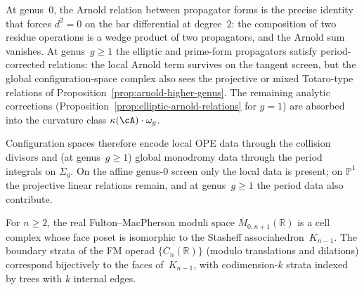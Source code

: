 \begin{example}
At genus~$0$, the Arnold relation between propagator forms is the precise
identity that forces $d^2 = 0$ on the bar differential at degree~$2$:
the composition of two residue operations is a wedge product of two
propagators, and the Arnold sum vanishes. At genus~$g \geq 1$ the
elliptic and prime-form propagators satisfy period-corrected relations:
the local Arnold term survives on the tangent screen, but the global
configuration-space complex also sees the projective or mixed
Totaro-type relations of Proposition~\ref{prop:arnold-higher-genus}.
The remaining analytic corrections
\textup{(}Proposition~\ref{prop:elliptic-arnold-relations} for $g = 1$\textup{)}
are absorbed into the curvature class
$\kappa(\cA)\cdot \omega_g$.

Configuration spaces therefore encode local OPE data through the
collision divisors and (at genus~$g \geq 1$) global monodromy data
through the period integrals on $\Sigma_g$. On the affine genus-$0$
screen only the local data is present; on $\mathbb{P}^1$ the
projective linear relations remain, and at genus~$g \geq 1$ the period
data also contribute.
\end{example}

\begin{theorem}\label{thm:fm-associahedron}
For $n \geq 2$, the real Fulton--MacPherson moduli space $\overline{M}_{0,n+1}(\mathbb{R})$ is a cell complex whose face poset is isomorphic to the Stasheff associahedron~$K_{n-1}$. The boundary strata of the FM operad $\{\overline{C}_n(\mathbb{R})\}$ (modulo translations and dilations) correspond bijectively to the faces of~$K_{n-1}$, with codimension-$k$ strata indexed by trees with $k$ internal edges.
\end{theorem}


